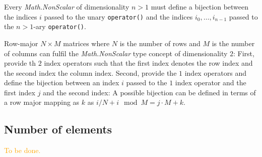 \documentclass[oneside]{book}
\begin{document}
Every \textit{Math.NonScalar} of dimensionality $n > 1$     must define a
bijection between the indices $i$ passed to the unary \texttt{operator()}
and the indices $i_0,\ldots,i_{n-1}$ passed to the            $n > 1$-ary
\texttt{operator()}.\newline

\begin{tcolorbox}[title=Example]
Row-major $N \times M$ matrices where $N$ is the   number of
rows and $M$ is the number of columns can fulfil         the
\textit{Math.NonScalar} type concept of  dimensionality $2$:
First, provide th $2$ index operators such that the first
index denotes the row index and the second index      the
column index.
Second, provide the $1$ index   operators and define the
bijection between an index $i$ passed to the $1$   index
operator and the first index $j$   and the second index:
A possible bijection can be defined in terms of a    row
major mapping as $k$ as $i / N + i\mod M= j \cdot M +k$.
\end{tcolorbox}

\subsection{Number of elements}
\textcolor{orange}{To be done.}


\end{document}
